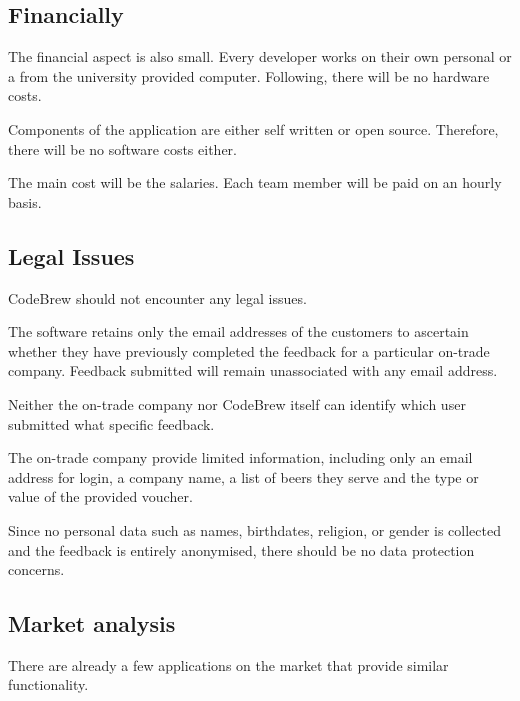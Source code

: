 \documentclass[a4paper,12pt]{article}
\begin{document}
\subsection{Financially}
The financial aspect is also small. Every developer works on their own personal or a from the university provided computer.
Following, there will be no hardware costs.

Components of the application are either self written or open source. Therefore, there will be no software costs either.

The main cost will be the salaries. Each team member will be paid on an hourly basis.

\subsection{Legal Issues}
CodeBrew should not encounter any legal issues.

The software retains only the email addresses of the customers to ascertain whether they have previously completed the feedback for a particular on-trade company.
Feedback submitted will remain unassociated with any email address.

Neither the on-trade company nor CodeBrew itself can identify which user submitted what specific feedback.

The on-trade company provide limited information, including only an email address for login, a company name, a list of beers they serve and the type or value of the provided voucher.

Since no personal data such as names, birthdates, religion, or gender is collected and the feedback is entirely anonymised, there should be no data protection concerns.

\subsection{Market analysis}
There are already a few applications on the market that provide similar functionality.
\end{document}
